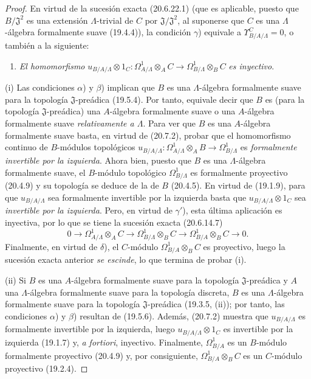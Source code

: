 \begin{proof}
En virtud de la sucesión exacta (20.6.22.1) (que es aplicable, puesto que
$B/\mathfrak J^2$ es una extensión $\Lambda$-trivial de $C$ por
$\mathfrak J/\mathfrak J^2$, al suponerse que $C$ es una $\Lambda$-álgebra
formalmente suave (19.4.4)), la condición $\gamma$) equivale a
$\Upsilon^C_{B/A/\Lambda}=0$, o también a la siguiente:
\begin{enumerate}
  \item[$\gamma'$)] \emph{El homomorfismo}
  $u_{B/A/\Lambda}\otimes 1_C:\Omega^1_{A/\Lambda}\otimes_A C\to\Omega^1_{B/\Lambda}\otimes_B C$
  \emph{es inyectivo}.
\end{enumerate}

(i) Las condiciones $\alpha$) y $\beta$) implican que $B$ es una
$\Lambda$-álgebra formalmente suave para la topología
$\mathfrak J$-preádica (19.5.4). Por tanto, equivale decir que $B$ es (para la
topología $\mathfrak J$-preádica) una $A$-álgebra formalmente suave o una
$A$-álgebra formalmente suave \emph{relativamente a $\Lambda$}. Para ver que
$B$ es una $A$-álgebra formalmente suave basta, en virtud de (20.7.2), probar
que el homomorfismo continuo de $B$-módulos topológicos
$u_{B/A/\Lambda}:\Omega^1_{A/\Lambda}\otimes_A B\to\Omega^1_{B/\Lambda}$
es \emph{formalmente invertible por la izquierda}. Ahora bien, puesto que $B$
es una $\Lambda$-álgebra formalmente suave, el $B$-módulo topológico
$\Omega^1_{B/\Lambda}$ es formalmente proyectivo (20.4.9) y su topología se
deduce de la de $B$ (20.4.5). En virtud de (19.1.9), para que
$u_{B/A/\Lambda}$ sea formalmente invertible por la izquierda basta que
$u_{B/A/\Lambda}\otimes 1_C$ sea \emph{invertible por la izquierda}. Pero, en virtud
de $\gamma'$), esta última aplicación es inyectiva, por lo que se tiene la
sucesión exacta (20.6.14.7)
\[
  0\longrightarrow\Omega^1_{A/\Lambda}\otimes_A C
  \longrightarrow\Omega^1_{B/\Lambda}\otimes_B C
  \longrightarrow\Omega^1_{B/A}\otimes_B C\longrightarrow0.
\]
Finalmente, en virtud de $\delta$), el $C$-módulo
$\Omega^1_{B/A}\otimes_BC$ es proyectivo, luego la sucesión exacta anterior
\emph{se escinde}, lo que termina de probar (i).



(ii) Si $B$ es una $A$-álgebra formalmente suave para la topología
$\mathfrak J$-preádica y $A$ una $\Lambda$-álgebra formalmente suave para la
topología discreta, $B$ es una $\Lambda$-álgebra formalmente suave para la topología
$\mathfrak J$-preádica (19.3.5, (ii)); por tanto, las condiciones $\alpha$) y
$\beta$) resultan de (19.5.6). Además, (20.7.2) muestra que
$u_{B/A/\Lambda}$ es formalmente 
invertible por la izquierda, luego
$u_{B/A/\Lambda}\otimes 1_C$ es invertible por la izquierda (19.1.7) y, \emph{a
fortiori}, inyectivo. Finalmente, $\Omega^1_{B/A}$ es un $B$-módulo
formalmente proyectivo (20.4.9) y, por consiguiente,
$\Omega^1_{B/A}\otimes_BC$ es un $C$-módulo proyectivo (19.2.4).
\end{proof}

